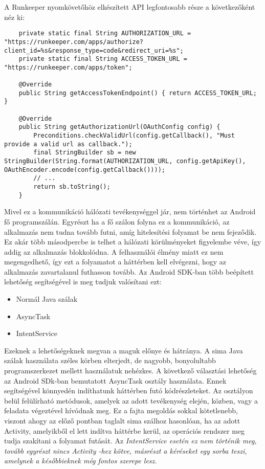 A Runkeeper nyomkövetőhöz elkészített API legfontosabb része a következőként néz ki:

\begin{lstlisting}
    private static final String AUTHORIZATION_URL = "https://runkeeper.com/apps/authorize?client_id=%s&response_type=code&redirect_uri=%s";
    private static final String ACCESS_TOKEN_URL = "https://runkeeper.com/apps/token";

    @Override
    public String getAccessTokenEndpoint() { return ACCESS_TOKEN_URL; }

    @Override
    public String getAuthorizationUrl(OAuthConfig config) {
        Preconditions.checkValidUrl(config.getCallback(), "Must provide a valid url as callback.");
        final StringBuilder sb = new StringBuilder(String.format(AUTHORIZATION_URL, config.getApiKey(), OAuthEncoder.encode(config.getCallback())));
        // ...
        return sb.toString();
    }
\end{lstlisting}

Mivel ez a kommunikáció hálózati tevékenységgel jár, nem történhet az Android fő programszálán. 
Egyrészt ha a fő szálon folyna ez a kommunikáció, az alkalmazás nem tudna tovább futni, amíg hitelesítési folyamat be nem fejeződik. 
Ez akár több másodpercbe is telhet a hálózati körülményeket figyelembe véve, így addig az alkalmazás blokkolódna. 
A felhasználói élmény miatt ez nem megengedhető, így ezt a folyamatot a háttérben kell elvégezni, hogy az alkalmazás zavartalanul futhasson tovább. 
Az Android SDK-ban több beépített lehetőség segítségével is meg tudjuk valósítani ezt:

\begin{itemize}
	\item Normál Java szálak 
	\item AsyncTask 
	\item IntentService 
\end{itemize}

Ezeknek a lehetőségeknek megvan a maguk előnye és hátránya. 
A sima Java szálak használata széles körben elterjedt, de nagyobb, bonyolultabb programszerkezet mellett használatuk nehézkes. 
A következő választási lehetőség az Android SDk-ban bemutatott AsyncTask osztály használata. 
Ennek segítségével könnyedén indíthatunk háttérben futó kódrészleteket. 
Az osztályon belül felülírható metódusok, amelyek az adott tevékenység elején, közben, vagy a feladata végeztével hívódnak meg. 
Ez a fajta megoldás sokkal kötetlenebb, viszont ahogy az előző pontban taglalt sima szálhoz hasonlóan, ha az adott Activity, amelyikből el lett indítva háttérbe kerül, az operációs rendszer meg tudja szakítani a folyamat futását. 
Az \it IntentService \rm esetén ez nem történik meg, tovább egyrészt nincs \it Activity \rm-hez kötve, másrészt a kéréseket egy sorba teszi, amelynek a későbbieknek még fontos szerepe lesz. 
















